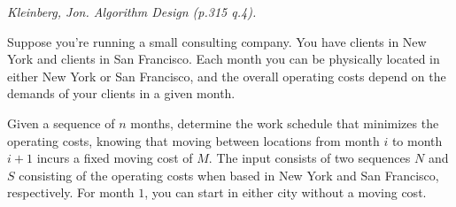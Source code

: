 \documentclass[solutionorbox,answers]{exam}
\begin{document}
\begin{questions}

\newpage

\question \textit{Kleinberg, Jon. Algorithm Design (p.315 q.4).}

Suppose you're running a small consulting company. You have clients in New York and clients in San Francisco. Each month you can be physically located in either New York or San Francisco, and the overall operating costs depend on the demands of your clients in a given month.

Given a sequence of $n$ months, determine the work schedule that minimizes the operating costs, knowing that moving between locations from month $i$ to month $i+1$ incurs a fixed moving cost of $M$. The input consists of two sequences $N$ and $S$ consisting of the operating costs when based in New York and San Francisco, respectively. For month $1$, you can start in either city without a moving cost. 

\end{questions}
\end{document}
